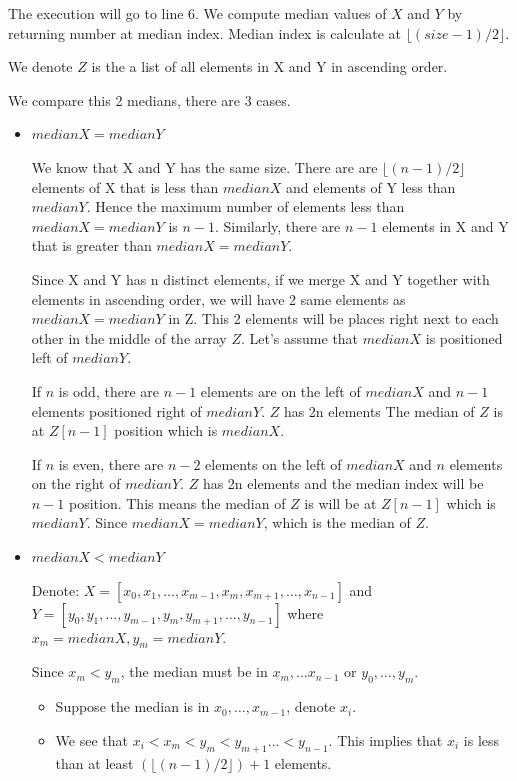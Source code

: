 \documentclass{cpsc413Solutions}
\begin{document}
\begin{problemlist}
\begin{problem}
\begin{enumerate}
The execution will go to line 6. We compute median values of $X$ and $Y$ by returning number at median index. Median index is calculate at $\lfloor (size-1)/2 \rfloor$.

We denote $Z$ is the a list of all elements in X and Y in ascending order.

We compare this 2 medians, there are 3 cases.

\begin{itemize}
    \item $medianX = medianY$
    
    We know that X and Y has the same size. There are are $\lfloor(n-1)/2\rfloor$ elements of X that is less than $medianX$ and elements of Y less than $medianY$. Hence the maximum number of elements less than $medianX = medianY$ is $n-1$. Similarly, there are $n-1$ elements in X and Y that is greater than $medianX=medianY$.
    
    Since X and Y has n distinct elements, if we merge X and Y together with elements in ascending order, we will have 2 same elements as $medianX=medianY$ in Z. This 2 elements will be places right next to each other in the middle of the array $Z$. Let's assume that $medianX$ is positioned left of $medianY$.
    
    If $n$ is odd, there are $n-1$ elements are on the left of $medianX$ and $n-1$ elements positioned right of $medianY$. $Z$ has 2n elements The median of $Z$ is at $Z[n-1]$ position which is $medianX$.
    
    If $n$ is even, there are $n-2$ elements on the left of $medianX$ and $n$ elements on the right of $medianY$. $Z$ has 2n elements and the median index will be $n-1$ position. This means the median of $Z$ is will be at $Z[n-1]$ which is $medianY$. Since $medianX=medianY$, which is the median of $Z$.
    
    \item $medianX < medianY$
    
    Denote: $X = [x_0,x_1, \dots, x_{m-1},x_m, x_{m+1}, \dots , x_{n-1}]$ and $Y = [y_0,y_1, \dots, y_{m-1},y_m, y_{m+1}, \dots , y_{n-1}]$ where $x_m = medianX, y_m = medianY$. 
    
    Since $x_m < y_m$, the median must be in $x_{m}, \dots x_{n-1}$ or $y_0, \dots, y_m$. 
    
    \begin{itemize}
        \item Suppose the median is in $x_0, \dots, x_{m-1}$, denote $x_i$.
        \item We see that $x_i < x_m < y_m < y_{m+1} ... < y_{n-1}$. This implies that $x_i$ is less than at least $(\lfloor(n-1)/2\rfloor)+1$ elements. 
        

\end{itemize}
\end{itemize}
\end{enumerate}
\end{problem}
\end{problemlist}
\end{document}
